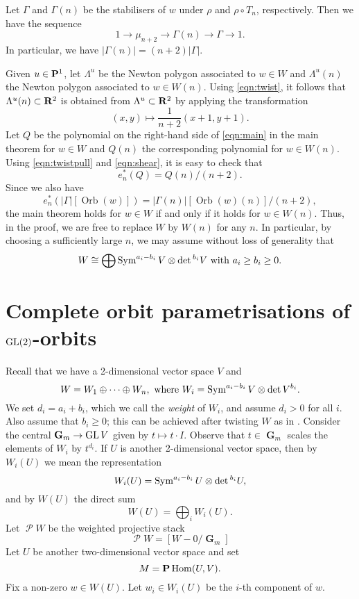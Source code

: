 \documentclass{amsart}
\DeclareMathOperator{\G}{\mathbf G}
\DeclareMathOperator{\Orb}{Orb}
\DeclareMathOperator{\sP}{\mathscr P}
\begin{document}
Let \(\Gamma\) and \(\Gamma(n)\) be the stabilisers of \(w\) under \(\rho\) and \(\rho \circ T_n\), respectively.
Then we have the sequence
\[ 1 \to \mu_{n+2} \to \Gamma(n) \to \Gamma \to 1.\]
In particular, we have \(|\Gamma(n)| = (n+2)|\Gamma|\).

Given \(u \in \P^1\), let \(\Lambda^u\) be the Newton polygon associated to \(w \in W\) and \(\Lambda^u(n)\) the Newton polygon associated to \(w \in W(n)\).
Using \eqref{eqn:twist}, it follows that \(\Lambda^u(n) \subset \R^2\) is obtained from \(\Lambda^u \subset \R^2\) by applying the transformation
\begin{equation}\label{eqn:shear}
  (x,y) \mapsto \frac{1}{n+2}(x+1,y+1).
\end{equation}
Let \(Q\) be the polynomial on the right-hand side of \eqref{eqn:main} in the main theorem for \(w \in W\) and \(Q(n)\) the corresponding polynomial for \(w \in W(n)\).
Using \eqref{eqn:twistpull} and \eqref{eqn:shear}, it is easy to check that
\[ e_n^{*}(Q) = Q(n)/(n+2).\]
Since we also have \[e_n^{*}(|\Gamma|[\Orb(w)]) = |\Gamma(n)|[\Orb(w)(n)]/(n+2),\] the main theorem holds for \(w \in W\)  if and only if it holds for \(w \in W(n)\).
Thus, in the proof, we are free to replace \(W\) by \(W(n)\) for any \(n\).
In particular, by choosing a sufficiently large \(n\), we may assume without loss of generality that 
\begin{equation}\label{eq:positiveb}
  W \cong \bigoplus \Sym^{a_i-b_i}V \otimes \det{}^{b_i} V \text{ with } a_i \geq b_i \geq 0.
\end{equation}



\section{Complete orbit parametrisations of \(\GL(2)\)-orbits}\label{sec:completeparam}
Recall that we have a 2-dimensional vector space \(V\) and 
\[ W = W_{1} \oplus \cdots \oplus W_{n}, \text{ where } W_i = \Sym^{a_i-b_i}V \otimes \det{V}^{b_i}.\]
We set \(d_i = a_i+b_i\), which we call the \emph{weight} of \(W_i\), and assume \(d_i > 0\) for all \(i\).
Also assume that \(b_i \geq 0\); this can be achieved after twisting \(W\) as in .
Consider the central \(\mathbf{G}_{m} \to \GL V\) given by \(t \mapsto t \cdot I\).
Observe that \(t \in \G_{m}\) scales the elements of \(W_i\) by \(t^{d_i}\).
If \(U\) is another 2-dimensional vector space, then by \(W_{i}(U)\) we mean the representation
\[ W_{i}(U) = \Sym^{a_{i}-b_{i}}U \otimes \det{}^{b_{i}}U,\]
and by \(W(U)\) the direct sum
\[ W(U) = \bigoplus_{i} W_{i}(U).\]
Let \(\sP W\) be the weighted projective stack
\[ \sP W = \left[ W - 0 \big / \G_{m} \right]\]
Let \(U\) be another two-dimensional vector space and set
\[ M = \P \Hom(U, V).\]
Fix a non-zero \(w \in W(U)\).
Let \(w_{i} \in W_{i}(U)\) be the \(i\)-th component of \(w\).
\end{document}
